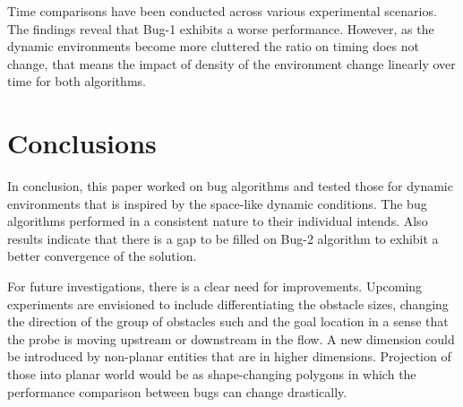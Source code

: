 \documentclass{IEEEtaes}
\begin{document}
Time comparisons have been conducted across various experimental scenarios. The findings reveal that Bug-1 exhibits a worse performance. However, as the dynamic environments become more cluttered the ratio on timing does not change, that means the impact of density of the environment change linearly over time for both algorithms.


\section{\large \textbf{Conclusions}}

In conclusion, this paper worked on bug algorithms and tested those for dynamic environments that is inspired by the space-like dynamic conditions. 
The bug algorithms performed in a consistent nature to their individual intends. Also results indicate that there is a gap to be filled on Bug-2 algorithm to exhibit a better convergence of the solution.

For future investigations, there is a clear need for improvements. Upcoming experiments are envisioned to include differentiating the obstacle sizes, changing the direction of the group of obstacles such and the goal location in a sense that the probe is moving upstream or downstream in the flow. A new dimension could be introduced by non-planar entities that are in higher dimensions. Projection of those into planar world would be as shape-changing polygons in which the performance comparison between bugs can change drastically.



\ %
\end{document}
